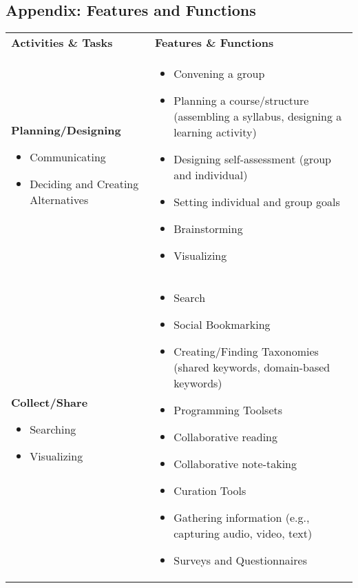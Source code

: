 \newpage
\subsection{Appendix: Features and Functions}
{
\centering
{\Tiny
\begin{tabular}{p{}p{}@{\hspace{.2in}}}
\textbf{\small Activities \& Tasks} & \textbf{\small Features \& Functions}\\[.1in]
\textbf{Planning/Designing}
\begin{itemize}[noitemsep]
\item
  Communicating
\item
  Deciding and Creating Alternatives
\end{itemize} &
\begin{itemize}[noitemsep]
\item
  Convening a group
\item
  Planning a course/structure (assembling a syllabus, designing a
  learning activity)
\item
  Designing self-assessment (group and individual)
\item
  Setting individual and group goals
\item
  Brainstorming
\item
  Visualizing
\end{itemize} \\
\textbf{Collect/Share}
\begin{itemize}[noitemsep]
\item
  Searching
\item
  Visualizing
\end{itemize} &
\begin{itemize}[noitemsep]
\item
  Search
\item
  Social Bookmarking
\item
  Creating/Finding Taxonomies (shared keywords, domain-based keywords)
\item
  Programming Toolsets
\item
  Collaborative reading
\item
  Collaborative note-taking
\item
  Curation Tools
\item
  Gathering information (e.g., capturing audio, video, text)
\item
  Surveys and Questionnaires
\end{itemize} \\

\end{tabular}}}
